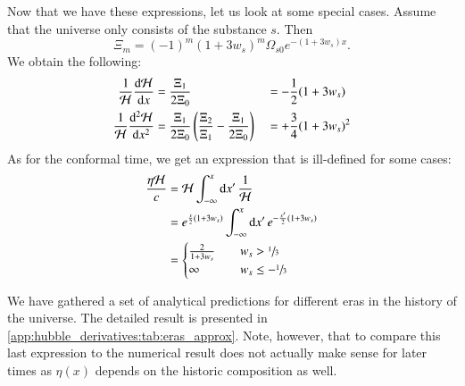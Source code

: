Now that we have these expressions, let us look at some special cases. Assume that the universe only consists of the substance $s$. Then
\begin{equation}
    \Xi_m = (-1)^m(1+3w_s)^m \Omega_{s0}e^{-(1+3w_s)x}.
\end{equation}
We obtain the following:
\begin{subequations}
    \begin{align}
        \frac{1}{\mathcal{H}} \dv{\mathcal{H}}{x} &= \frac{\Xi_1}{2\Xi_0} &&= - \frac{1}{2}(1+3w_s) \\
        \frac{1}{\mathcal{H}} \dv[2]{\mathcal{H}}{x} &= \frac{\Xi_1}{2\Xi_0} \left( \frac{\Xi_2}{\Xi_1}- \frac{\Xi_1}{2\Xi_0}  \right) &&=+ \frac{3}{4}(1+3w_s)^2
    \end{align}
\end{subequations}
As for the conformal time, we get an expression that is ill-defined for some cases:
\begin{equation}
    \begin{split}
        \frac{\eta \mathcal{H}}{c} &= \mathcal{H} \int_{-\infty}^{x} \mathrm{d} x'\, \frac{1}{\mathcal{H}} \\
            &= e^{\frac{x}{2}(1+3w_s)} \int_{-\infty}^{x} \mathrm{d} x' \,e^{-\frac{x'}{2}(1+3w_s)} \\
            &= \begin{cases}
                \frac{2}{1+3w_s} \quad& w_s > \sfrac{1}{3} \\
                \infty & w_s \leq -\sfrac{1}{3}
            \end{cases}
    \end{split}
\end{equation}

We have gathered a set of analytical predictions for different eras in the history of the universe. The detailed result is presented in \cref{app:hubble_derivatives:tab:eras_approx}. Note, however, that to compare this last expression to the numerical result does not actually make sense for later times as $\eta(x)$ depends on the historic composition as well.

